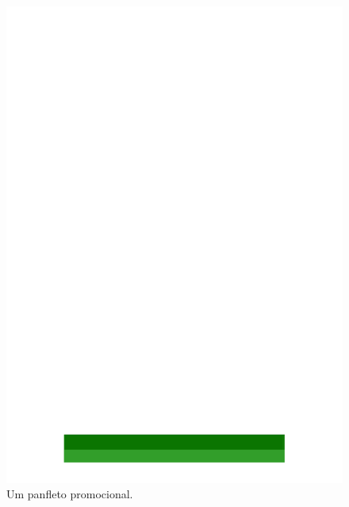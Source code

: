 \documentclass[a4paper]{ifacconf}
\begin{document}
\begin{figure}
	\begin{center}
		\includegraphics[scale=0.3]{figuras/panfleto-promocional.pdf}    
		\caption{Um panfleto promocional.} 
		\label{fig:panfleto}
	\end{center}
\end{figure}
\end{document}
